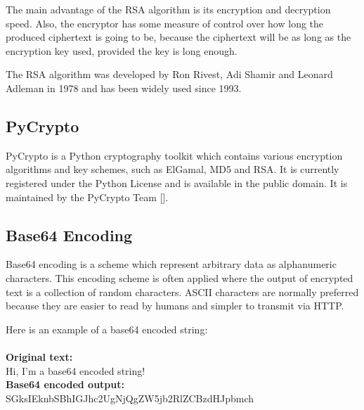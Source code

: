 The main advantage of the RSA algorithm is its encryption and decryption speed. Also, the
encryptor has some measure of control over how long the produced ciphertext is going to be,
because the ciphertext will be as long as the encryption key used, provided the key is long
enough.

The RSA algorithm was developed by Ron Rivest, Adi Shamir and Leonard Adleman in 1978 and has
been widely used since 1993. 

\subsection{PyCrypto}

PyCrypto is a Python cryptography toolkit which contains various encryption algorithms and
key schemes, such as ElGamal, MD5 and RSA. It is currently registered under the
Python License and is available in the public domain. It is maintained by the
PyCrypto Team [\cite{website:pycrypto}].

\subsection{Base64 Encoding}
\label{sec:base64}

Base64 encoding is a scheme which represent arbitrary data as alphanumeric
characters. This encoding scheme is often applied where the output of encrypted
text is a collection of random characters. ASCII characters are normally
preferred because they are easier to read by humans and simpler to transmit via
HTTP. 

Here is an example of a base64 encoded string:\\\\
\textbf{Original text:}\\
Hi, I'm a base64 encoded string!\\
\textbf{Base64 encoded output:}\\
SGksIEknbSBhIGJhc2UgNjQgZW5jb2RlZCBzdHJpbmch
